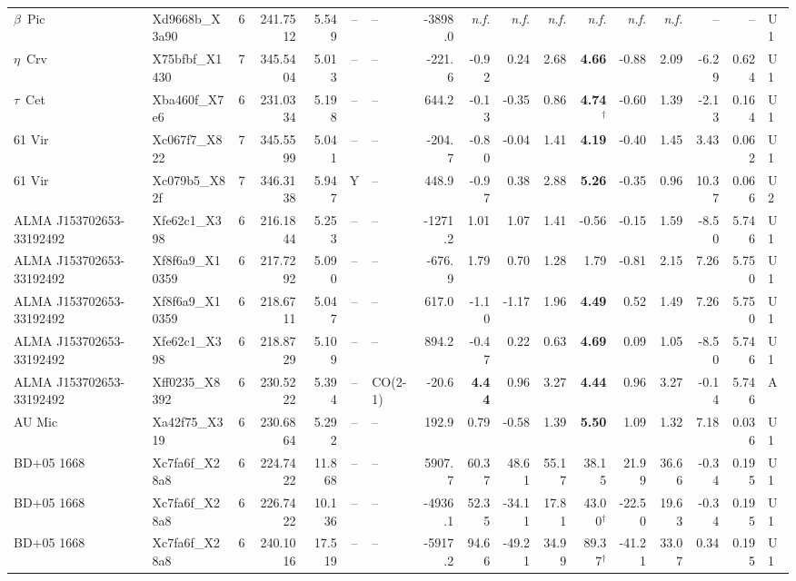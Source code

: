 \begin{tabular}{@{}l@{~}l@{~}c@{~}r@{~}r@{~}c@{~}l@{~}r@{~~}r@{~}r@{~}r@{~~}r@{~}r@{~}r@{~~}r@{~}r@{~}l@{}}
$\beta$~Pic & Xd9668b\_X3a90 & 6 & 241.7512 & 5.549 & -- & -- & -3898.0 & \emph{n.f.} & \emph{n.f.} & \emph{n.f.} & \emph{n.f.} & \emph{n.f.} & \emph{n.f.} & -- & -- & U1 \\
$\eta$~Crv & X75bfbf\_X1430 & 7 & 345.5404 & 5.013 & -- & -- & -221.6 & -0.92 & 0.24 & 2.68 & \textbf{4.66} & -0.88 & 2.09 & -6.29 & 0.624 & U1 \\
$\tau$~Cet & Xba460f\_X7e6 & 6 & 231.0334 & 5.198 & -- & -- & 644.2 & -0.13 & -0.35 & 0.86 & \textbf{4.74}$^{\dagger}$ & -0.60 & 1.39 & -2.13 & 0.164 & U1 \\
61 Vir & Xc067f7\_X822 & 7 & 345.5599 & 5.041 & -- & -- & -204.7 & -0.80 & -0.04 & 1.41 & \textbf{4.19} & -0.40 & 1.45 & 3.43 & 0.062 & U1 \\
61 Vir & Xc079b5\_X82f & 7 & 346.3138 & 5.947 & Y & -- & 448.9 & -0.97 & 0.38 & 2.88 & \textbf{5.26} & -0.35 & 0.96 & 10.37 & 0.066 & U2 \\
ALMA J153702653-33192492 & Xfe62c1\_X398 & 6 & 216.1844 & 5.253 & -- & -- & -1271.2 & 1.01 & 1.07 & 1.41 & -0.56 & -0.15 & 1.59 & -8.50 & 5.746 & U1 \\
ALMA J153702653-33192492 & Xf8f6a9\_X10359 & 6 & 217.7292 & 5.090 & -- & -- & -676.9 & 1.79 & 0.70 & 1.28 & 1.79 & -0.81 & 2.15 & 7.26 & 5.750 & U1 \\
ALMA J153702653-33192492 & Xf8f6a9\_X10359 & 6 & 218.6711 & 5.047 & -- & -- & 617.0 & -1.10 & -1.17 & 1.96 & \textbf{4.49} & 0.52 & 1.49 & 7.26 & 5.750 & U1 \\
ALMA J153702653-33192492 & Xfe62c1\_X398 & 6 & 218.8729 & 5.109 & -- & -- & 894.2 & -0.47 & 0.22 & 0.63 & \textbf{4.69} & 0.09 & 1.05 & -8.50 & 5.746 & U1 \\
ALMA J153702653-33192492 & Xff0235\_X8392 & 6 & 230.5222 & 5.394 & -- & CO(2-1) & -20.6 & \textbf{4.44} & 0.96 & 3.27 & \textbf{4.44} & 0.96 & 3.27 & -0.14 & 5.746 & A \\
AU Mic & Xa42f75\_X319 & 6 & 230.6864 & 5.292 & -- & -- & 192.9 & 0.79 & -0.58 & 1.39 & \textbf{5.50} & 1.09 & 1.32 & 7.18 & 0.036 & U1 \\
BD+05 1668 & Xc7fa6f\_X28a8 & 6 & 224.7422 & 11.868 & -- & -- & 5907.7 & 60.37 & 48.61 & 55.17 & 38.15 & 21.99 & 36.66 & -0.34 & 0.195 & U1 \\
BD+05 1668 & Xc7fa6f\_X28a8 & 6 & 226.7422 & 10.136 & -- & -- & -4936.1 & 52.35 & -34.11 & 17.81 & 43.00$^{\dagger}$ & -22.50 & 19.63 & -0.34 & 0.195 & U1 \\
BD+05 1668 & Xc7fa6f\_X28a8 & 6 & 240.1016 & 17.519 & -- & -- & -5917.2 & 94.66 & -49.21 & 34.99 & 89.37$^{\dagger}$ & -41.21 & 33.07 & 0.34 & 0.195 & U1 \\

\end{tabular}
